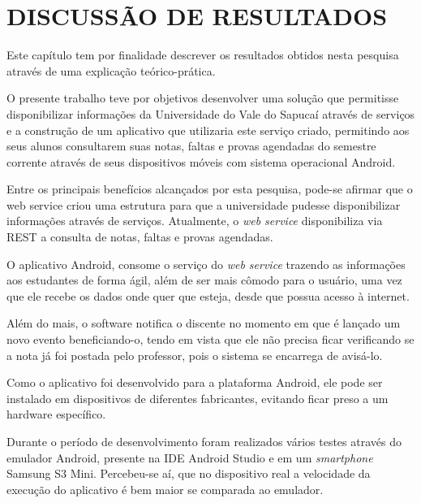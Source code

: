 
\chapter{DISCUSSÃO DE RESULTADOS} 

	\par Este capítulo tem por finalidade descrever os resultados obtidos nesta
pesquisa através de uma explicação teórico-prática.

	\par O presente trabalho teve por objetivos desenvolver uma solução que
permitisse disponibilizar informações da Universidade do Vale do Sapucaí
através de serviços e a construção de um aplicativo que utilizaria este serviço
criado, permitindo aos seus alunos consultarem suas notas, faltas e provas
agendadas do semestre corrente através de seus dispositivos móveis com sistema
operacional Android.

	\par Entre os principais benefícios alcançados por esta pesquisa, pode-se
afirmar que o web service criou uma estrutura para que a universidade pudesse
disponibilizar informações através de serviços. Atualmente, o \textit{web
service} disponibiliza via REST a consulta de notas, faltas e provas agendadas.

	\par O aplicativo Android, consome o serviço do \textit{web service} trazendo
as informações aos estudantes de forma ágil, além de ser mais cômodo para o
usuário, uma vez que ele recebe os dados onde quer que esteja, desde que possua
acesso à internet.

	\par Além do mais, o software notifica o discente no momento em que é lançado
um novo evento beneficiando-o, tendo em vista que ele não precisa ficar
verificando se a nota já foi postada pelo professor, pois o sistema se
encarrega de avisá-lo.

	\par Como o aplicativo foi desenvolvido para a plataforma Android, ele pode ser
instalado em dispositivos de diferentes fabricantes, evitando ficar preso a um
hardware específico.

	\par Durante o período de desenvolvimento foram realizados vários testes
através do emulador Android, presente na IDE Android Studio e em um
\textit{smartphone} Samsung S3 Mini. Percebeu-se aí, que no dispositivo real a
velocidade da execução do aplicativo é bem maior se comparada ao emulador.

